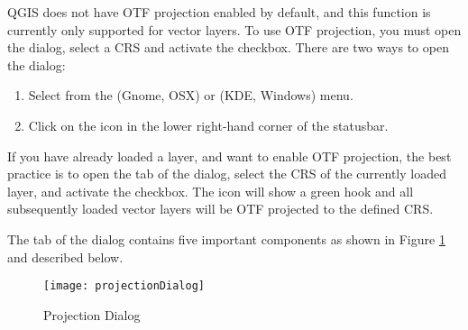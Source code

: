 QGIS does not have OTF projection enabled by default, and this function is
currently only supported for vector layers. To use OTF projection, you must
open the  dialog, select a
CRS and activate the  checkbox.
There are two ways to open the dialog:

\begin{enumerate}
\item Select  from the
 (Gnome, OSX) or  (KDE, Windows) menu.
\item Click on the  icon in the
lower right-hand corner of the statusbar.
\end{enumerate}

If you have already loaded a layer, and want to enable OTF projection, the
best practice is to open the  tab of the
 dialog, select the CRS of the currently loaded
layer, and activate the  checkbox. The
 icon will show a green hook
and all subsequently loaded vector layers will be OTF projected to the
defined CRS.

The  tab of the 
dialog contains five important components as shown in Figure
\ref{fig:projections} and described below.

\begin{figure}[ht]
   \centering
   \texttt{[image: projectionDialog]}
   \caption{Projection Dialog \nixcaption}\label{fig:projections}
\end{figure}

